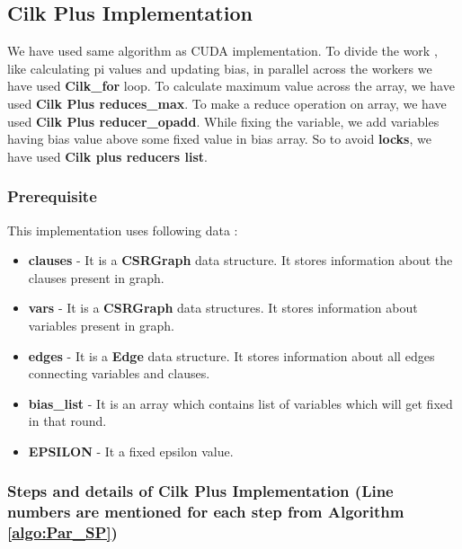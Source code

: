 \documentclass{article}
\begin{document}
\subsection{Cilk Plus Implementation}

We have used same algorithm as CUDA implementation. To divide the work  , like calculating pi values and updating bias, in parallel across the workers we have used \textbf{Cilk\_for} loop. To calculate maximum value across the array, we have used \textbf{Cilk Plus reduces\_max}. To make a reduce operation on array, we have used \textbf{Cilk Plus reducer\_opadd}. While fixing the variable, we add variables having bias value above some fixed value in bias array. So to avoid \textbf{locks}, we have used \textbf{Cilk plus reducers list}. 

\subsubsection{Prerequisite}
This implementation uses following data :
\begin{itemize}
\item \textbf{clauses} - It is a \textbf{CSRGraph} data structure. It stores information about the clauses present in graph.
\item \textbf{vars} - It is a \textbf{CSRGraph} data structures. It stores information about variables present in graph.
\item \textbf{edges} - It is a \textbf{Edge} data structure. It stores information about all edges connecting variables and clauses.
\item \textbf{bias\_list} - It is an array which contains list of variables which will get fixed in that round.
\item \textbf{EPSILON} - It a fixed epsilon value.
\end{itemize}

\subsubsection{Steps and details of Cilk Plus Implementation (Line numbers are mentioned for each step from Algorithm \ref{algo:Par_SP})}
\end{document}
